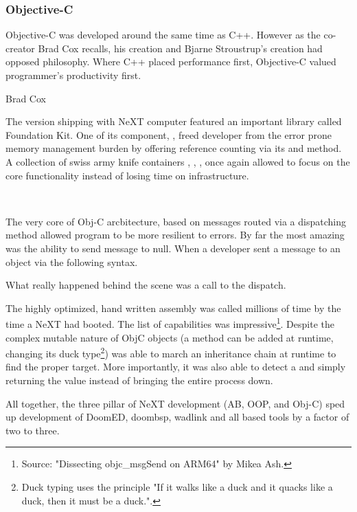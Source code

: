 \par
\subsubsection{Objective-C}
Objective-C was developed around the same time as C++. However as the co-creator Brad Cox recalls, his creation and Bjarne Stroustrup's creation had opposed philosophy. Where C++ placed performance first, Objective-C valued programmer's productivity first.\\
\par
{} {Brad Cox}\\
\par


\par
The version shipping with NeXT computer featured an important library called Foundation Kit. One of its component, , freed developer from the error prone memory management burden by offering reference counting via its  and  method. A collection of swiss army knife containers , , ,  once again allowed to focus on the core functionality instead of losing time on infrastructure.\\
\par
{}\\
\par
The very core of Obj-C arcbitecture, based on messages routed via a dispatching method  allowed program to be more resilient to errors. By far the most amazing was the ability to send message to null. When a developer sent a message to an object via the following syntax.\\ \par
{}
What really happened behind the scene was a call to the dispatch.\\
\par
{}
The highly optimized, hand written assembly was called millions of time by the time a NeXT had booted. The list of capabilities was impressive\footnote{Source: "Dissecting objc\_msgSend on ARM64" by Mikea Ash.}. Despite the complex mutable nature of ObjC objects (a method can be added at runtime, changing its duck type\footnote{Duck typing uses the principle "If it walks like a duck and it quacks like a duck, then it must be a duck.".})  was able to march an inheritance chain at runtime to find the proper target. More importantly, it was also able to detect a  and simply returning the value  instead of bringing the entire process down.\\
\par

All together, the three pillar of NeXT development (AB, OOP, and Obj-C) sped up development of DoomED, doombsp, wadlink and all \NeXT based tools by a factor of two to three.

